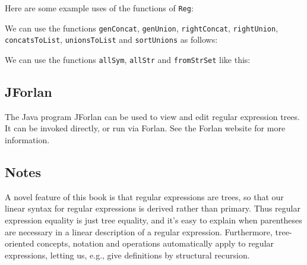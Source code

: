 Here are some example uses of the functions of \texttt{Reg}:

We can use the functions \texttt{genConcat}, \texttt{genUnion},
\texttt{rightConcat}, \texttt{rightUnion}, \texttt{concatsToList},
\texttt{unionsToList} and \texttt{sortUnions} as follows:

We can use the functions \texttt{allSym}, \texttt{allStr} and
\texttt{fromStrSet} like this:


\subsection{JForlan}

The Java program JForlan
%
can be used to view and edit regular expression trees.  It can be
invoked directly, or run via Forlan.  See the Forlan website for more
information.

\subsection{Notes}

A novel feature of this book is that regular expressions are trees, so
that our linear syntax for regular expressions is derived rather than
primary.  Thus regular expression equality is just tree equality,
and it's easy to explain when parentheses are necessary in
a linear description of a regular expression.  Furthermore,
tree-oriented concepts, notation and operations automatically
apply to regular expressions, letting us, e.g., give definitions
by structural recursion.
%

